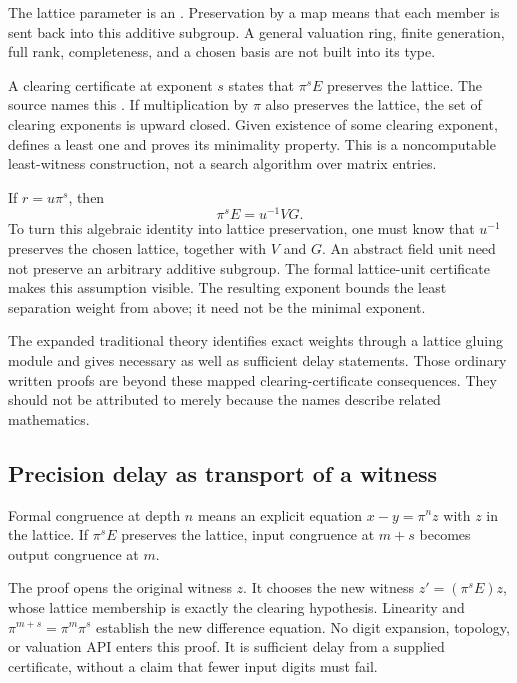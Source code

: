 The lattice parameter is an . Preservation by a map means that each member is sent back into this additive subgroup. A general valuation ring, finite generation, full rank, completeness, and a chosen basis are not built into its type.

A clearing certificate at exponent $s$ states that $\pi^sE$ preserves the lattice. The source names this . If multiplication by $\pi$ also preserves the lattice, the set of clearing exponents is upward closed. Given existence of some clearing exponent,  defines a least one and proves its minimality property. This is a noncomputable least-witness construction, not a search algorithm over matrix entries.

If $r=u\pi^s$, then
\[
\pi^sE=u^{-1}VG.
\]
To turn this algebraic identity into lattice preservation, one must know that $u^{-1}$ preserves the chosen lattice, together with $V$ and $G$. An abstract field unit need not preserve an arbitrary additive subgroup. The formal lattice-unit certificate makes this assumption visible. The resulting exponent bounds the least separation weight from above; it need not be the minimal exponent.

The expanded traditional theory identifies exact weights through a lattice gluing module and gives necessary as well as sufficient delay statements. Those ordinary written proofs are beyond these mapped clearing-certificate consequences. They should not be attributed to  merely because the names describe related mathematics.

\subsection{Precision delay as transport of a witness}

Formal congruence at depth $n$ means an explicit equation $x-y=\pi^nz$ with $z$ in the lattice. If $\pi^sE$ preserves the lattice, input congruence at $m+s$ becomes output congruence at $m$.

The proof opens the original witness $z$. It chooses the new witness $z'=(\pi^sE)z$, whose lattice membership is exactly the clearing hypothesis. Linearity and $\pi^{m+s}=\pi^m\pi^s$ establish the new difference equation. No digit expansion, topology, or valuation API enters this proof. It is sufficient delay from a supplied certificate, without a claim that fewer input digits must fail.

